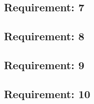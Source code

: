 \documentclass[a4paper,twoside,11pt]{article}
\begin{document}
\begin{appendices}
	\subsection{Requirement: 7}
	
	\subsection{Requirement: 8}
	
	\subsection{Requirement: 9}
	
	\subsection{Requirement: 10}
	



\end{appendices}
\end{document}
